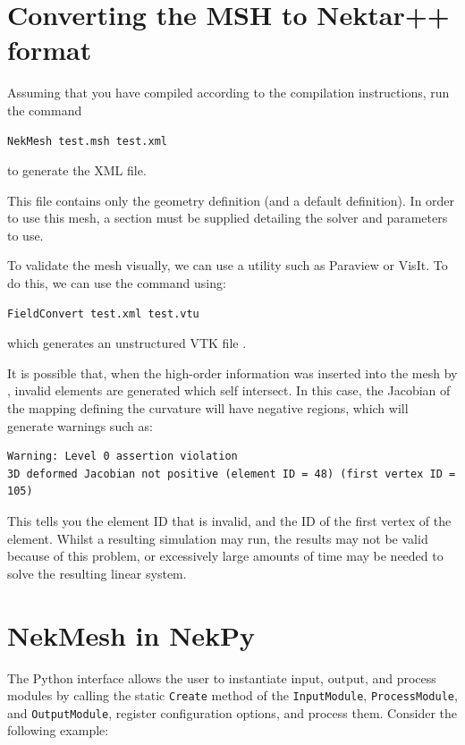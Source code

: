 \section{Converting the MSH to Nektar++ format}
Assuming that you have compiled \nekpp according to the compilation
instructions, run the command
%
\begin{lstlisting}[style=BashInputStyle]
NekMesh test.msh test.xml
\end{lstlisting}
%
to generate the XML file.
%
\begin{notebox}
  This file contains only the geometry definition (and a default
   definition). In order to use this mesh, a
   section must be supplied detailing the solver and
  parameters to use.
\end{notebox}
%
To validate the mesh visually, we can use a utility such as Paraview or
VisIt. To do this, we can use the  command using:
%
\begin{lstlisting}[style=BashInputStyle]
FieldConvert test.xml test.vtu
\end{lstlisting}
%
which generates an unstructured VTK file .

It is possible that, when the high-order information was inserted into the mesh
by \gmsh, invalid elements are generated which self intersect. In this case, the
Jacobian of the mapping defining the curvature will have negative regions, which
will generate warnings such as:
\begin{lstlisting}[style=BashInputStyle]
Warning: Level 0 assertion violation
3D deformed Jacobian not positive (element ID = 48) (first vertex ID = 105)
\end{lstlisting}
This tells you the element ID that is invalid, and the ID of the first vertex of
the element. Whilst a resulting simulation may run, the results may not be valid
because of this problem, or excessively large amounts of time may be needed to
solve the resulting linear system.


\section{NekMesh in NekPy}

The Python interface allows the user to instantiate input,
output, and process modules by calling the static \verb+Create+ method of the
\verb+InputModule+, \verb+ProcessModule+, and \verb+OutputModule+,
register configuration options, and process them.
Consider the following example:

